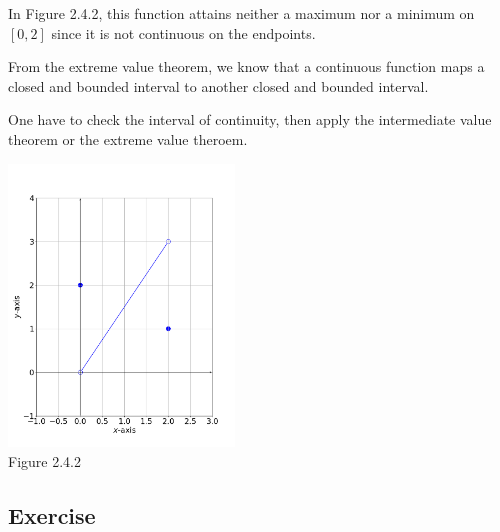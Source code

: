 \documentclass[11pt]{book}
\theoremstyle{break}
\theoremstyle{no_label}
\newcommand{\figtag}[1]{\\[-1.2em]Figure {#1}}
\numberwithin{equation}{section}
\begin{document}
\begin{example}
    In Figure 2.4.2, this function attains neither a maximum nor a minimum on $[0, 2]$ since it is not continuous on the endpoints.
\end{example}

From the extreme value theorem, we know that a continuous function maps a closed and bounded interval to another closed and bounded interval.

\begin{remark}
    One have to check the interval of continuity, then apply the intermediate value theorem or the extreme value theroem.
\end{remark}

\begin{center}
    \includegraphics[width=0.45\textwidth]{evt.png}\figtag{2.4.2}
\end{center}


\subsection*{Exercise}
\end{document}
